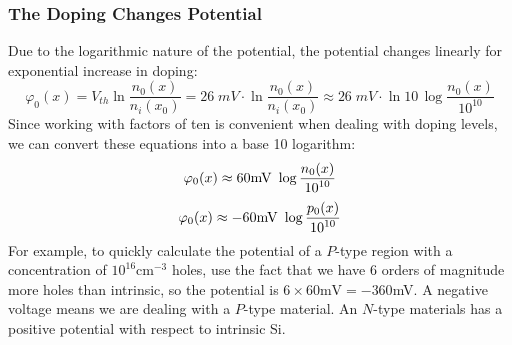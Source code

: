 \subsubsection{The Doping Changes Potential}
Due to the logarithmic nature of the potential, the potential changes linearly for exponential increase in doping:
    \begin{equation} 
        \varphi _0(x) = V_{th} \ln \frac{n_0(x)}{n_i(x_0)} = 26\;mV \cdot \ln \frac{n_0(x)}{n_i(x_0)} 
        \approx 26\;mV \cdot \ln 10\,\log \frac{n_0(x)}{{10}^{10}} 
    \end{equation}
\newpage
Since working with factors of ten is convenient when dealing with doping levels, we can convert these equations into a base 10 logarithm:
    \begin{equation} 
        {\varphi _0}(x) \approx 60{\rm{mV}}\,\,\log \frac{{{n_0}(x)}}{{{{10}^{10}}}} 
    \end{equation}
    \begin{equation} 
        {\varphi _0}(x) \approx  - 60{\rm{mV}}\,\,\log \frac{{{p_0}(x)}}{{{{10}^{10}}}} 
    \end{equation}
For example, to quickly calculate the potential of a $P$-type region with a concentration of $10^{16} \mathrm{cm}^{-3}$ holes, use the fact that we have 6 orders of magnitude more holes than intrinsic, so the potential is $6 \times 60\mathrm{mV} = -360 $mV.  A negative voltage means we are dealing with a $P$-type material.  An $N$-type materials has a positive potential with respect to intrinsic Si.
